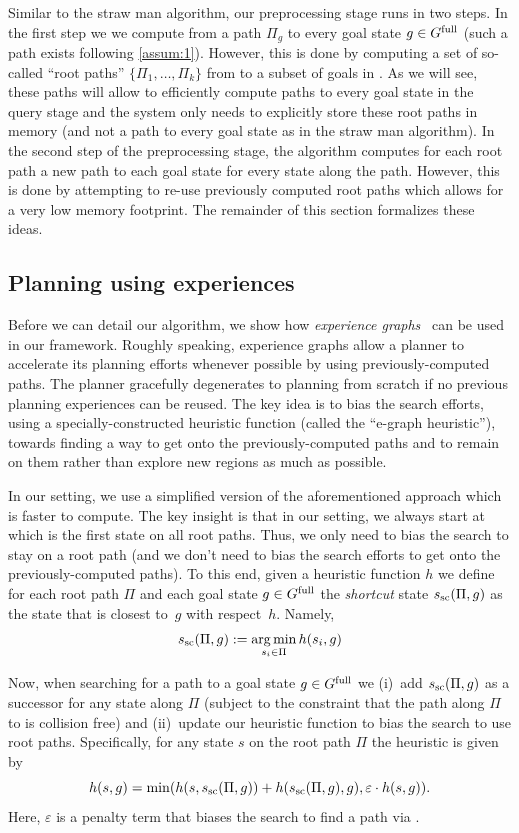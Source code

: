 \documentclass[conference]{IEEEtran}
\DeclareMathOperator*{\argmin}{arg\,min}
\begin{document}
Similar to the straw man algorithm, our preprocessing stage runs in two steps.
In the first step we we compute from \Shome a path $\Pi_g$ to every goal state $ g \in G^{\textrm{full}}$ (such a path exists following \ref{assum:1}). However, this is done by computing a set of so-called ``root paths'' $\{\Pi_1, \ldots, \Pi_k \}$ from \Shome to a subset of goals in \Gfull. 
As we will see, these paths will allow to efficiently compute paths to every goal state in the query stage and the system only needs to explicitly store these root paths in memory (and not a path to every goal state as in the straw man algorithm).
%
In the second step of the preprocessing stage, the algorithm computes for each root path a new path to each goal state for every state along the path. However, this is done by attempting to re-use previously computed root paths which allows for a very low memory footprint.
%
The remainder of this section formalizes these ideas.

\subsection{Planning using experiences}
\label{subsec:experience}
Before we can detail our algorithm, we show how \emph{experience graphs}~\cite{PCCL12} can be used in our framework.
%
Roughly speaking, experience graphs allow a planner  to accelerate its planning efforts whenever possible by using previously-computed paths. The planner gracefully degenerates to planning from scratch if no previous planning experiences can be reused.
%
The key idea is to bias the search efforts, using a specially-constructed heuristic function (called the ``e-graph heuristic''), towards finding a way to get onto the previously-computed paths and to remain on them rather than explore new regions as much as possible. 

In our setting, we use a simplified version of the aforementioned approach which is faster to compute.
%
The key insight is that in our setting, we always start at \Shome which is the first state on all root paths. Thus, we only need to bias the search to stay on a root path (and we don't need to bias the search efforts to get onto the previously-computed paths).
%
To this end, given a heuristic function $h$ we define for each root path $\Pi$ and each goal state $g \in G^{\textrm{full}}$ the \emph{shortcut} state $s_{\textrm{sc}} (\Pi,g)$ as the   state that is closest to~$g$ with respect~$h$.
Namely,
$$
\Ssc (\Pi,g) := \argmin\limits_{s_i \in \Pi} h(s_i, g)
$$

Now, when searching for a path to a goal state $g \in G^{\textrm{full}}$ we
(i)~add $s_{\textrm{sc}} (\Pi,g)$ as a successor for any state along $\Pi$
(subject to the constraint that the path along $\Pi$ to \Ssc is collision free)
and
(ii)~update our heuristic function to bias the search to use root paths. Specifically, for any state $s$ on the root path $\Pi$ the heuristic is given by
$$
h(s,g) = \min(h(s,s_{\textrm{sc}} (\Pi,g)) + h(s_{\textrm{sc}} (\Pi,g),g), \varepsilon \cdot h(s,g)).
$$
Here, $\varepsilon$ is a penalty term that biases the search to find a path via \Ssc.
\end{document}
